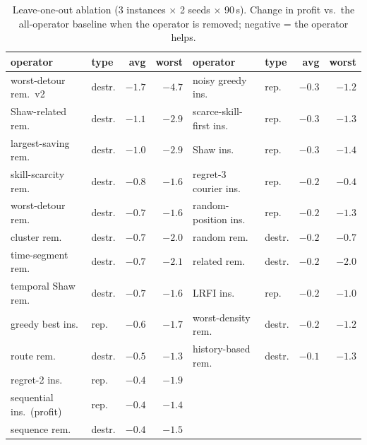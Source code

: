 \documentclass[10pt, a4paper]{article}
\begin{document}
\begin{table}[t]
\centering\small
\caption{Leave-one-out ablation (3 instances $\times$ 2 seeds $\times$
90\,s). Change in profit vs.\ the all-operator baseline when the operator is
removed; negative = the operator helps.}
\label{tab:ablation}
\begin{tabular}{llrr@{\qquad}llrr}
\toprule
operator & type & avg & worst & operator & type & avg & worst \\
\midrule
worst-detour rem.\ v2 & destr. & $-1.7$ & $-4.7$ & noisy greedy ins.    & rep. & $-0.3$ & $-1.2$ \\
Shaw-related rem.     & destr. & $-1.1$ & $-2.9$ & scarce-skill-first ins. & rep. & $-0.3$ & $-1.3$ \\
largest-saving rem.   & destr. & $-1.0$ & $-2.9$ & Shaw ins.            & rep. & $-0.3$ & $-1.4$ \\
skill-scarcity rem.   & destr. & $-0.8$ & $-1.6$ & regret-3 courier ins.& rep. & $-0.2$ & $-0.4$ \\
worst-detour rem.     & destr. & $-0.7$ & $-1.6$ & random-position ins. & rep. & $-0.2$ & $-1.3$ \\
cluster rem.          & destr. & $-0.7$ & $-2.0$ & random rem.          & destr. & $-0.2$ & $-0.7$ \\
time-segment rem.     & destr. & $-0.7$ & $-2.1$ & related rem.         & destr. & $-0.2$ & $-2.0$ \\
temporal Shaw rem.    & destr. & $-0.7$ & $-1.6$ & LRFI ins.            & rep. & $-0.2$ & $-1.0$ \\
greedy best ins.      & rep.   & $-0.6$ & $-1.7$ & worst-density rem.   & destr. & $-0.2$ & $-1.2$ \\
route rem.            & destr. & $-0.5$ & $-1.3$ & history-based rem.   & destr. & $-0.1$ & $-1.3$ \\
regret-2 ins.         & rep.   & $-0.4$ & $-1.9$ & & & & \\
sequential ins.\ (profit) & rep. & $-0.4$ & $-1.4$ & & & & \\
sequence rem.         & destr. & $-0.4$ & $-1.5$ & & & & \\
\bottomrule
\end{tabular}
\end{table}
\end{document}
